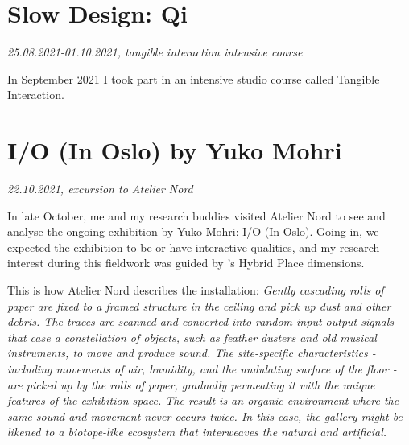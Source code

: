 \section{Slow Design: Qi}
\par
\emph{25.08.2021-01.10.2021, tangible interaction intensive course}
\par

In September 2021 I took part in an intensive studio course called Tangible Interaction. 



\section{I/O (In Oslo) by Yuko Mohri}
\par
\emph{22.10.2021, excursion to Atelier Nord}
\par

In late October, me and my research buddies visited Atelier Nord to see and analyse the ongoing exhibition by Yuko Mohri: I/O (In Oslo). Going in, we expected the exhibition to be or have interactive qualities, and my research interest during this fieldwork was guided by \autocite{hybridplace_ciolfi}'s Hybrid Place dimensions. 

This is how Atelier Nord describes the installation: 
\emph{Gently cascading rolls of paper are fixed to a framed structure in the ceiling and pick up dust and other debris. The traces are scanned and converted into random input-output signals that case a constellation of objects, such as feather dusters and old musical instruments, to move and produce sound. The site-specific characteristics - including movements of air, humidity, and the undulating surface of the floor - are picked up by the rolls of paper, gradually permeating it with the unique features of the exhibition space. The result is an organic environment where the same sound and movement never occurs twice. In this case, the gallery might be likened to a biotope-like ecosystem that interweaves the natural and artificial.} \autocite{yukomohri_web}

